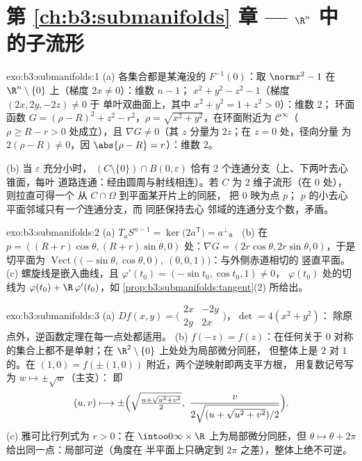 \section*{第 \ref{ch:b3:submanifolds} 章 --- 
$\R^n$ 中的子流形}

\begin{solution}{exo:b3:submanifolds:1}
(a) 各集合都是某淹没的 $F^{-1}(0)$：取 $\norm x^2 - 1$ 在
$\R^n\setminus\{0\}$ 上（梯度 $2x \neq 0$）：维数 $n-1$；
$x^2 + y^2 - z^2 - 1$（梯度 $(2x, 2y, -2z) \neq 0$ 于
单叶双曲面上，其中 $x^2 + y^2 = 1 + z^2 > 0$）：维数 $2$；
环面函数 $G = (\rho - R)^2 + z^2 - r^2$，$\rho =
\sqrt{x^2+y^2}$，在环面附近为 $\mathcal C^\infty$（$\rho
\geq R - r > 0$ 处成立），且 $\nabla G \neq 0$（其
$z$ 分量为 $2z$；在 $z = 0$ 处，径向分量
为 $2(\rho - R)\ne0$，因 $\abs{\rho - R} = r$）：维数
$2$。

(b) 当 $\varepsilon$ 充分小时，
$(C\setminus\{0\})\cap B(0,\varepsilon)$ 恰有 $2$
个连通分支（上、下两叶去心锥面，每叶
道路连通：经由圆周与射线相连）。若 $C$
为 $2$ 维子流形（在 $0$ 处），则拉直可得一个
从 $C\cap\Omega$ 到平面某开片上的同胚，
把 $0$ 映为点 $p$；
$p$ 的小去心平面邻域只有\emph{一个}连通分支，而
同胚保持去心
邻域的连通分支个数，矛盾。
\end{solution}

\begin{solution}{exo:b3:submanifolds:2}
(a) $T_aS^{n-1} = \ker\bigl(2a^{\mathsf T}\bigr) = a^\perp$。
(b) 在 $p = ((R+r)\cos\theta, (R+r)\sin\theta, 0)$ 处：$\nabla G
= (2r\cos\theta, 2r\sin\theta, 0)$，于是切平面为
$\operatorname{Vect}\bigl((-\sin\theta, \cos\theta, 0),\ (0,
0, 1)\bigr)$：与外侧赤道相切的
竖直平面。
(c) 螺旋线是嵌入曲线，且 $\varphi'(t_0) =
(-\sin t_0, \cos t_0, 1) \neq 0$，
$\varphi(t_0)$ 处的切线为 $\varphi(t_0) + \R\,\varphi'(t_0)$，如
\cref{prop:b3:submanifolds:tangent}(2) 所给出。
\end{solution}

\begin{solution}{exo:b3:submanifolds:3}
(a) $Df(x,y) = \bigl(\begin{smallmatrix}2x & -2y\\ 2y &
2x\end{smallmatrix}\bigr)$，$\det = 4(x^2 + y^2)$：
除原点外，逆函数定理在每一点处都适用。
(b) $f(-z) = f(z)$：在任何关于
$0$ 对称的集合上都不是单射；在 $\R^2\setminus\{0\}$ 上处处为局部微分同胚，
但整体上是 $2$ 对 $1$ 的。在 $(1, 0) = f(\pm(1,
0))$ 附近，两个逆映射即两支平方根，
用复数记号写为 $w \mapsto \pm\sqrt w$（主支）：
即
\[
(u, v) \longmapsto \pm\Bigl(\sqrt{\tfrac{u +
\sqrt{u^2+v^2}}{2}},\ \frac{v}{2\sqrt{(u +
\sqrt{u^2+v^2})/2}}\Bigr).
\]
(c) 雅可比行列式为 $r > 0$：在
$\intoo0\infty\times\R$ 上为局部微分同胚，但 $\theta \mapsto \theta + 2\pi$
给出同一点：局部可逆（角度在
半平面上只确定到 $2\pi$ 之差），整体上绝不可逆。
\end{solution}

